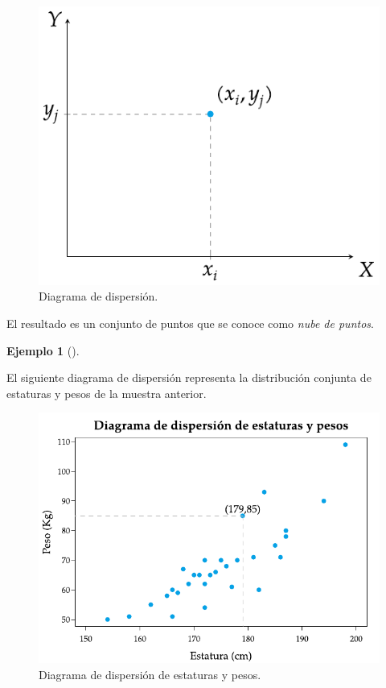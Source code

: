 \documentclass[
  a4paper,
]{scrreport}
\theoremstyle{plain}
\theoremstyle{definition}
\newtheorem{example}{Ejemplo}[chapter]
\theoremstyle{definition}
\theoremstyle{remark}
\begin{document}
\begin{figure}[H]

{\centering \includegraphics{img/regresion/diagrama_dispersion.pdf}

}

\caption{Diagrama de dispersión.}

\end{figure}%

El resultado es un conjunto de puntos que se conoce como \emph{nube de
puntos}.

\begin{example}[]\protect\hypertarget{exm-diagrama-dispersion}{}\label{exm-diagrama-dispersion}

El siguiente diagrama de dispersión representa la distribución conjunta
de estaturas y pesos de la muestra anterior.

\begin{figure}[H]

{\centering \includegraphics{img/regresion/diagrama_dispersion_estatura_peso.pdf}

}

\caption{Diagrama de dispersión de estaturas y pesos.}

\end{figure}%

\end{example}
\end{document}
